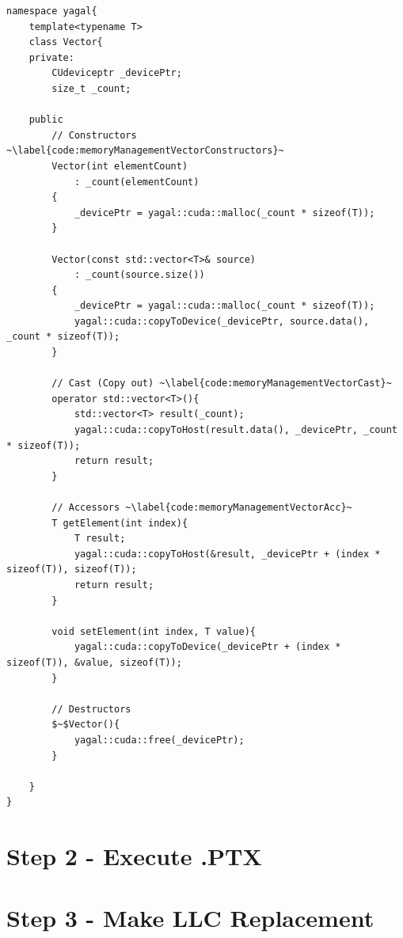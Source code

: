 

\begin{lstlisting}[caption={Vector class, showing only code relevant to memory management.}, label={code:memoryManagementVector}, mathescape]
namespace yagal{
    template<typename T>
    class Vector{
    private:
        CUdeviceptr _devicePtr;
        size_t _count;

    public
        // Constructors ~\label{code:memoryManagementVectorConstructors}~
        Vector(int elementCount)
            : _count(elementCount)
        {
            _devicePtr = yagal::cuda::malloc(_count * sizeof(T));
        }

        Vector(const std::vector<T>& source)
            : _count(source.size())
        {
            _devicePtr = yagal::cuda::malloc(_count * sizeof(T));
            yagal::cuda::copyToDevice(_devicePtr, source.data(), _count * sizeof(T));
        }

        // Cast (Copy out) ~\label{code:memoryManagementVectorCast}~
        operator std::vector<T>(){
            std::vector<T> result(_count);
            yagal::cuda::copyToHost(result.data(), _devicePtr, _count * sizeof(T));
            return result;
        }

        // Accessors ~\label{code:memoryManagementVectorAcc}~
        T getElement(int index){
            T result;
            yagal::cuda::copyToHost(&result, _devicePtr + (index * sizeof(T)), sizeof(T));
            return result;
        }

        void setElement(int index, T value){
            yagal::cuda::copyToDevice(_devicePtr + (index * sizeof(T)), &value, sizeof(T));
        }

        // Destructors
        $~$Vector(){
            yagal::cuda::free(_devicePtr);
        }

    }
}
\end{lstlisting}


\section{Step 2 - Execute .PTX}

\section{Step 3 - Make LLC Replacement}

